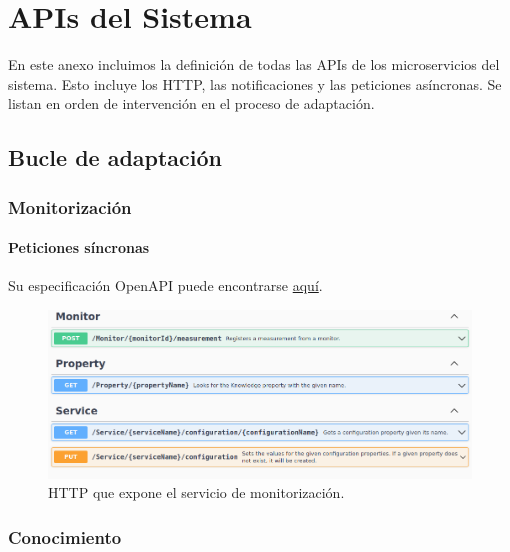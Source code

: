 \chapter{APIs del Sistema}
\label{anx:apis}

En este anexo incluimos la definición de todas las APIs de los microservicios del sistema. Esto incluye los  HTTP, las notificaciones y las peticiones asíncronas. Se listan en orden de intervención en el proceso de adaptación.

\section{Bucle de adaptación}

\subsection{Monitorización}

\subsubsection{Peticiones síncronas}

Su especificación OpenAPI puede encontrarse \href{https://github.com/Starkie/TFM-DistributedAutoadaptiveSystems/blob/1db95346290cb55edbfd5efb717785bcd06def79/src/AutoAdaptativeSystem/AdaptionLoop/Monitoring/Monitoring.Service-OpenAPISpec.json}{aquí}.

\begin{figure}[h!]
  \hspace{-0.25cm}
  \includegraphics[scale=0.45]{anx_apis/images/apis-monitoring}
  \caption{ HTTP que expone el servicio de monitorización.}
\end{figure}

\subsection{Conocimiento}

